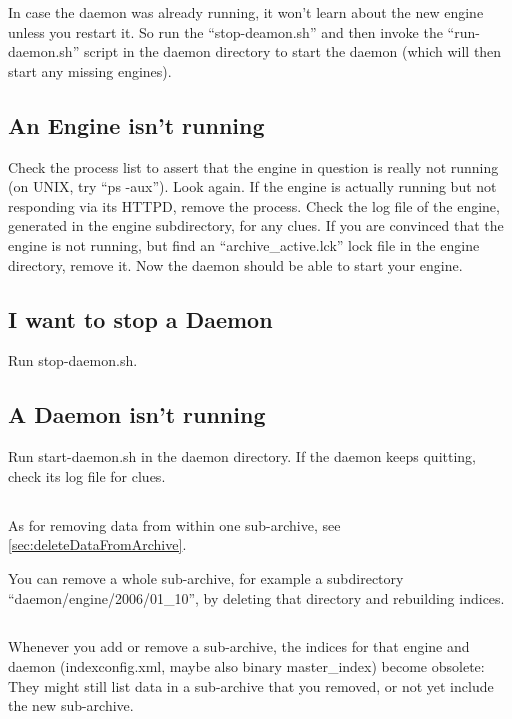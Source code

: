 In case the daemon was already running, it won't learn about the new
engine unless you restart it. So run the ``stop-deamon.sh'' and then
invoke the ``run-daemon.sh'' script in the daemon directory to start
the daemon (which will then start any missing engines).

\subsection{An Engine isn't running}
Check the process list to assert that the engine in question is really not
running (on UNIX, try ``ps -aux''). Look again. If the engine is
actually running but not responding via its HTTPD, remove the process.
Check the log file of the engine, generated in the engine
subdirectory, for any clues. If you are convinced that the engine is
not running, but find an ``archive\_active.lck'' lock file in the
engine directory, remove it. Now the daemon should be able to start
your engine.  

\subsection{I want to stop a Daemon}
Run stop-daemon.sh.

\subsection{A Daemon isn't running}
Run start-daemon.sh in the daemon directory. If the daemon keeps quitting,
check its log file for clues.

\subsection{}
As for removing data from within one sub-archive, see 
\ref{sec:deleteDataFromArchive}.

You can remove a whole sub-archive, for example a subdirectory
``daemon/engine/2006/01\_10'', by deleting that directory and rebuilding
indices.

\subsection{}
Whenever you add or remove a sub-archive, the indices for that engine
and daemon (indexconfig.xml, maybe also binary master\_index)
become obsolete: They might still list data in a
sub-archive that you removed, or not yet include the new
sub-archive.

